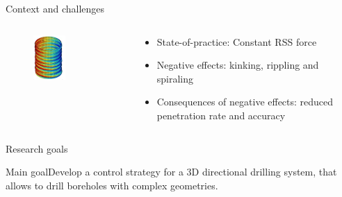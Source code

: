 \documentclass[10pt]{beamer}
\begin{document}
\begin{frame}{Context and challenges}
		\begin{columns}[T]
		\hspace{1cm}	\begin{column}{0.5\textwidth}\setlength{\leftmargini}{0pt}
				\vspace{1cm}
				\begin{figure}[ht]\centering
					\includegraphics[width=0.5\textwidth]{images/Spiraling.png}
				\end{figure}
			\centering	[Sugiura 2009]
			\end{column}
			\begin{column}{0.6\textwidth}\setlength{\leftmargini}{0pt}
				\begin{itemize}
					\setlength\itemsep{3em}
					\item State-of-practice: Constant RSS force
					\item Negative effects: kinking, rippling and spiraling
					\item Consequences of negative effects: reduced penetration rate and accuracy
				\end{itemize}			
			\end{column}
		\end{columns}
\end{frame}

\begin{frame}{Research goals}
	\begin{block}{Main goal}\Large Develop a control strategy for a 3D directional drilling system, that allows to drill boreholes with complex geometries.
	\end{block}
\end{frame}
\end{document}

